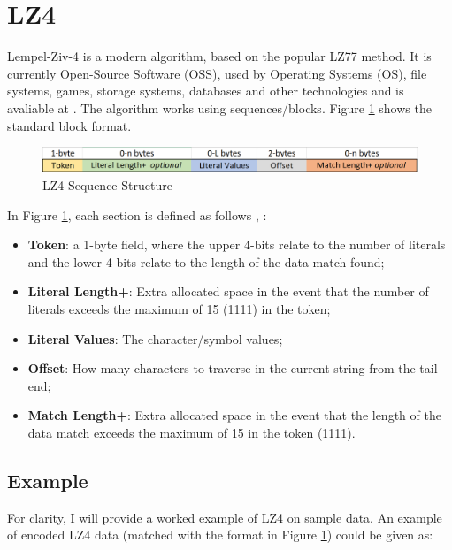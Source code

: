 \documentclass[12pt]{article}
\begin{document}
	\section{LZ4}

	Lempel-Ziv-4 is a modern algorithm, based on the popular LZ77 method. It is currently Open-Source Software (OSS), used by Operating Systems (OS), file systems, games, storage systems, databases and other technologies and is avaliable at \citep{lz4_github}. The algorithm works using sequences/blocks. Figure \ref{fig:lz4_ss} shows the standard block format.
	
	\begin{figure}[H]
		\centering
		\includegraphics[scale=0.45]{../Images/LZ4_Sequence_Structure.png}
		\caption{LZ4 Sequence Structure}
		\label{fig:lz4_ss}
	\end{figure}
	
	In Figure \ref{fig:lz4_ss}, each section is defined as follows \citep{how_lz4_works}, \citep{lz4_explained}:
	
	\begin{itemize}
		\item \textbf{Token}: a 1-byte field, where the upper 4-bits relate to the number of literals and the lower 4-bits relate to the length of the data match found;
		
		\item \textbf{Literal Length+}: Extra allocated space in the event that the number of literals exceeds the maximum of 15 (1111) in the token;
		
		\item \textbf{Literal Values}: The character/symbol values;
		
		\item \textbf{Offset}: How many characters to traverse in the current string from the tail end; 
		
		\item \textbf{Match Length+}: Extra allocated space in the event that the length of the data match exceeds the maximum of 15 in the token (1111).
	\end{itemize}
	
	\subsection{Example}
	For clarity, I will provide a worked example of LZ4 on sample data. An example of encoded LZ4 data (matched with the format in Figure \ref{fig:lz4_ss}) could be given as:
	
\end{document}
